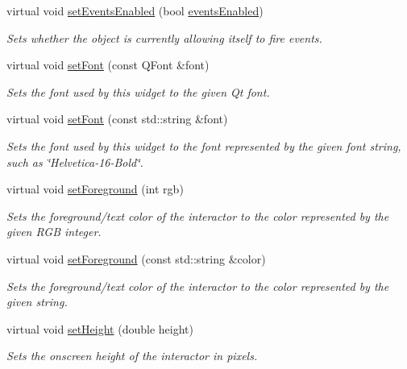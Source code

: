 \begin{DoxyCompactItemize}
virtual void \mbox{\hyperlink{classGObservable_afaa30b2a9e0f378fd1c70d2f1d0b8216}{set\+Events\+Enabled}} (bool \mbox{\hyperlink{classGInteractor_a597a370b592e3737d38d9d2f4e2031ea}{events\+Enabled}})
\begin{DoxyCompactList}\small\item\em Sets whether the object is currently allowing itself to fire events. \end{DoxyCompactList}\item 
virtual void \mbox{\hyperlink{classGInteractor_a2592348886ffea646c6534bf88f7c49d}{set\+Font}} (const Q\+Font \&font)
\begin{DoxyCompactList}\small\item\em Sets the font used by this widget to the given Qt font. \end{DoxyCompactList}\item 
virtual void \mbox{\hyperlink{classGInteractor_a8e096e8818d838aceae1d46d58fb3a7b}{set\+Font}} (const std\+::string \&font)
\begin{DoxyCompactList}\small\item\em Sets the font used by this widget to the font represented by the given font string, such as \char`\"{}\+Helvetica-\/16-\/\+Bold\char`\"{}. \end{DoxyCompactList}\item 
virtual void \mbox{\hyperlink{classGInteractor_a9eb856b5ff83a19df3831a31f15f4563}{set\+Foreground}} (int rgb)
\begin{DoxyCompactList}\small\item\em Sets the foreground/text color of the interactor to the color represented by the given R\+GB integer. \end{DoxyCompactList}\item 
virtual void \mbox{\hyperlink{classGInteractor_af59209aeadea6dfc6d97a2d8531f50e1}{set\+Foreground}} (const std\+::string \&color)
\begin{DoxyCompactList}\small\item\em Sets the foreground/text color of the interactor to the color represented by the given string. \end{DoxyCompactList}\item 
virtual void \mbox{\hyperlink{classGInteractor_a9e280bfc4544dfaf8e4376c4e1a74357}{set\+Height}} (double height)
\begin{DoxyCompactList}\small\item\em Sets the onscreen height of the interactor in pixels. \end{DoxyCompactList}\item 

\end{DoxyCompactItemize}

